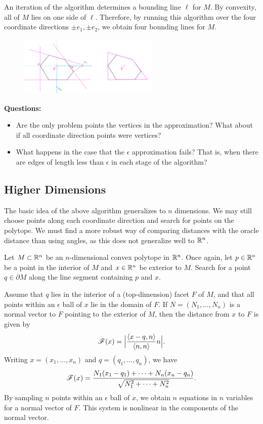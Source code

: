 \documentclass[12pt]{article}
\begin{document}
\begin{flushleft}
An iteration of the algorithm determines a bounding line $\ell$ for $M$.
By convexity, all of $M$ lies on one side of $\ell$.
Therefore, by running this algorithm over the four coordinate directions $\pm e_1,\pm e_2$, we obtain four bounding lines for $M$.
\begin{figure}[H]
	\centering
	\includegraphics[width=0.6\textwidth]{complete.png}
\end{figure}

\textbf{Questions:}
\begin{itemize}
	\item Are the only problem points the vertices in the approximation?
		What about if all coordinate direction points were vertices?
	\item What happens in the case that the $\epsilon$ approximation fails?
		That is, when there are edges of length less than $\epsilon$ in each stage of the algorithm?
\end{itemize}

\subsection{Higher Dimensions}

The basic idea of the above algorithm generalizes to $n$ dimensions.
We may still choose points along each coordinate direction and search for points on the polytope.
We must find a more robust way of comparing distances with the oracle distance than using angles, as this does not generalize well to $\mathbb{R}^n$.

Let $M\subset\mathbb{R}^n$ be an $n$-dimensional convex polytope in $\mathbb{R}^n$.
Once again, let $p\in\mathbb{R}^n$ be a point in the interior of $M$ and $x\in\mathbb{R}^n$ be exterior to $M$.
Search for a point $q\in \partial M$ along the line segment containing $p$ and $x$.

Assume that $q$ lies in the interior of a (top-dimension) facet $F$ of $M$, and that all points within an $\epsilon$ ball of $x$ lie in the domain of $F$.
If $N=(N_1,\dots, N_n)$ is a normal vector to $F$ pointing to the exterior of $M$, then the distance from $x$ to $F$ is given by 
\[\mathscr{F}(x) = \Big\lvert\frac{\langle x-q,n\rangle}{\langle n,n\rangle}n\Big\rvert.\]
Writing $x=(x_1,\dots, x_n)$ and $q=(q_1,\dots, q_n)$, we have
\[\mathscr{F}(x) = \frac{N_1(x_1-q_1)+\cdots+N_n(x_n-q_n)}{\sqrt{N_1^2+\cdots+N_n^2}}.\]
By sampling $n$ points within an $\epsilon$ ball of $x$, we obtain $n$ equations in $n$ variables for a normal vector of $F$.
This system is nonlinear in the components of the normal vector.


\end{flushleft}
\end{document}
